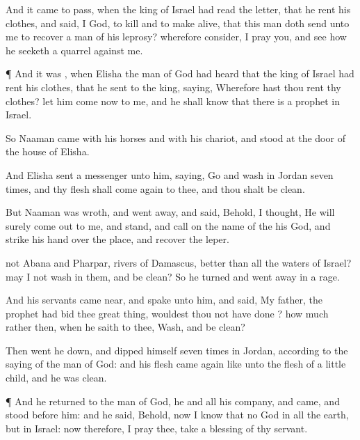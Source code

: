 {And it came to pass, when the
king of
Israel had
read the
letter, that he
rent his
clothes, and
said,
{} I
God, to
kill and to make
alive, that this
man doth
send unto me to
recover a
man of his
leprosy?
wherefore
consider, I pray you, and
see how he seeketh a
quarrel against me.


\par }{\PP {}¶ And it was
{}, when
Elisha the
man of
God had
heard that the
king of
Israel had
rent his
clothes, that he
sent to the
king,
saying, Wherefore hast thou
rent thy
clothes? let him
come now to me, and he shall
know that there
is a
prophet in
Israel.


\par }{\PP {}So
Naaman
came with his
horses and with his
chariot, and
stood at the
door of the
house of
Elisha.

And
Elisha
sent a
messenger unto him,
saying,
Go and
wash in
Jordan
seven
times, and thy
flesh shall come
again to thee, and thou shalt be
clean.

But
Naaman was
wroth, and went
away, and
said, Behold, I
thought, He will
surely come
out to me, and
stand, and
call on the
name of the
{} his
God, and
strike his
hand over the
place, and
recover the
leper.

 not
Abana and
Pharpar,
rivers of
Damascus,
better than all the
waters of
Israel? may I not
wash in them, and be
clean? So he
turned and went
away in a
rage.

And his
servants came
near, and
spake unto him, and
said, My
father,
{} the
prophet had
bid thee
{}
great
thing, wouldest thou not have
done
{}? how much rather
then, when he
saith to thee,
Wash, and be
clean?

Then went he
down, and
dipped himself
seven
times in
Jordan, according to the
saying of the
man of
God: and his
flesh came
again like unto the
flesh of a
little
child, and he was
clean.


\par }{\PP {}¶ And he
returned to the
man of
God, he and all his
company, and
came, and
stood
before him: and he
said, Behold, now I
know that
{} no
God in all the
earth, but in
Israel: now therefore, I pray thee,
take a
blessing of thy
servant.

}
